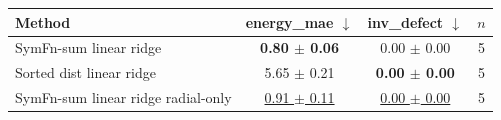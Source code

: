 \begin{tabular}{lccc}
\toprule
Method & energy\_mae $\downarrow$ & inv\_defect $\downarrow$ & $n$ \\
\midrule
SymFn-sum linear ridge & \textbf{0.80 $\pm$ 0.06} & 0.00 $\pm$ 0.00 & 5 \\
Sorted dist linear ridge & 5.65 $\pm$ 0.21 & \textbf{0.00 $\pm$ 0.00} & 5 \\
SymFn-sum linear ridge radial-only & \underline{0.91 $\pm$ 0.11} & \underline{0.00 $\pm$ 0.00} & 5 \\
\bottomrule
\end{tabular}
